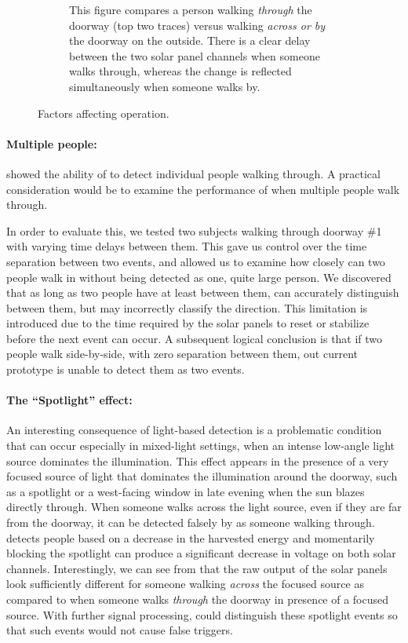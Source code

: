 \begin{figure}[t]
\begin{subfigure}[t]{0.38\textwidth}
        \caption{ This figure compares a person walking \textit{through} the doorway (top two traces) versus walking \textit{across or by} the doorway on the outside. There is a clear delay between the two solar panel channels when someone walks through, whereas the change is reflected simultaneously when someone walks by.}
        \label{fig:across}
    \end{subfigure}
    \caption{Factors affecting \sysname operation. \label{fig:confounds}}
\end{figure}


\paragraph{Multiple people:}
 showed the ability of \sysname to detect individual people walking through.
A practical consideration would be to examine the performance of \sysname when multiple people walk through.

In order to evaluate this, we tested two subjects walking through doorway \#1 with varying time delays between them.
This gave us control over the time separation between two events, and allowed us to examine how closely can two people walk in without being detected as one, quite large person.
We discovered that as long as two people have at least \minSeparation between them, \sysname can accurately distinguish between them, but may incorrectly classify the direction.
This limitation is introduced due to the time required by the solar panels to reset or stabilize before the next event can occur.
A subsequent logical conclusion is that if two people walk side-by-side, \ie with zero separation between them, out current prototype is unable to detect them as two events.

\paragraph{The ``Spotlight'' effect:}
An interesting consequence of light-based detection is a problematic condition that can occur especially in mixed-light settings, when an intense low-angle light source dominates the illumination.
This effect appears in the presence of a very focused source of light that dominates the illumination around the doorway, such as a spotlight or a west-facing window in late evening when the sun blazes directly through.
When someone walks across the light source, even if they are far from the doorway, it can be detected falsely by \sysname as someone walking through.
\sysname detects people based on a decrease in the harvested energy and momentarily blocking the spotlight can produce a significant decrease in voltage on both solar channels.
Interestingly, we can see from  that the raw output of the solar panels look sufficiently different for someone walking \textit{across} the focused source as compared to when someone walks \textit{through} the doorway in presence of a focused source.
With further signal processing, \sysname could distinguish these spotlight events so that such events would not cause false triggers.


